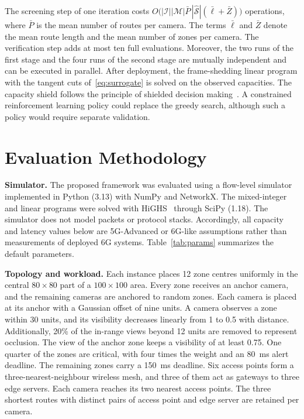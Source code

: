 \documentclass[letterpaper,journal]{IEEEtran}
\begin{document}
The screening step of one iteration costs $O\big(|\mathcal I||\mathcal M|\bar P\,|\hat{\mathcal S}|(\bar\ell+\bar Z)\big)$ operations, where $\bar P$ is the mean number of routes per camera. The terms $\bar\ell$ and $\bar Z$ denote the mean route length and the mean number of zones per camera. The verification step adds at most ten full evaluations. Moreover, the two runs of the first stage and the four runs of the second stage are mutually independent and can be executed in parallel. After deployment, the frame-shedding linear program with the tangent cuts of~\eqref{eq:surrogate} is solved on the observed capacities. The capacity shield follows the principle of shielded decision making~\cite{alshiekh2018shield}. A constrained reinforcement learning policy could replace the greedy search, although such a policy would require separate validation.

\section{Evaluation Methodology}
\textbf{Simulator.} The proposed framework was evaluated using a flow-level simulator implemented in Python (3.13) with NumPy and NetworkX. The mixed-integer and linear programs were solved with HiGHS~\cite{huangfu2018highs} through SciPy (1.18). The simulator does not model packets or protocol stacks. Accordingly, all capacity and latency values below are 5G-Advanced or 6G-like assumptions rather than measurements of deployed 6G systems. Table~\ref{tab:params} summarizes the default parameters.

\textbf{Topology and workload.} Each instance places 12 zone centres uniformly in the central $80\times80$ part of a $100\times100$ area. Every zone receives an anchor camera, and the remaining cameras are anchored to random zones. Each camera is placed at its anchor with a Gaussian offset of nine units. A camera observes a zone within 30 units, and its visibility decreases linearly from 1 to 0.5 with distance. Additionally, 20\% of the in-range views beyond 12 units are removed to represent occlusion. The view of the anchor zone keeps a visibility of at least 0.75. One quarter of the zones are critical, with four times the weight and an 80~ms alert deadline. The remaining zones carry a 150~ms deadline. Six access points form a three-nearest-neighbour wireless mesh, and three of them act as gateways to three edge servers. Each camera reaches its two nearest access points. The three shortest routes with distinct pairs of access point and edge server are retained per camera.
\end{document}
